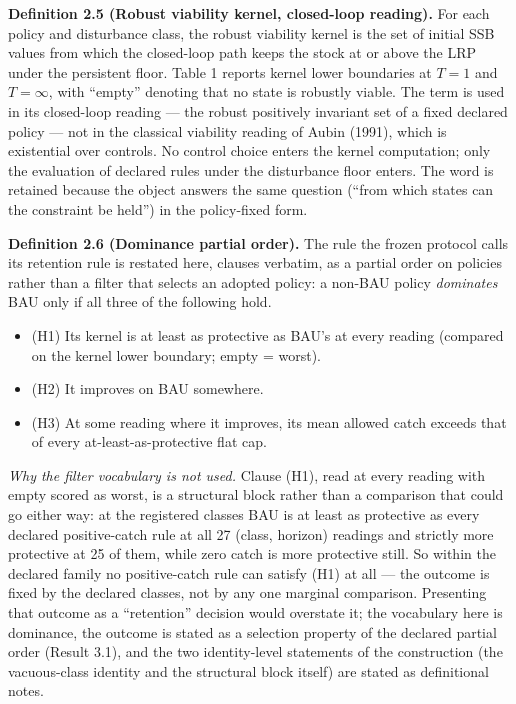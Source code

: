 \documentclass[11pt]{article}
\providecommand{\tightlist}{\setlength{\itemsep}{0pt}\setlength{\parskip}{0pt}}
\begin{document}
\textbf{Definition 2.5 (Robust viability kernel, closed-loop reading).}
For each policy and disturbance class, the robust viability kernel is
the set of initial SSB values from which the closed-loop path keeps the
stock at or above the LRP under the persistent floor. Table 1 reports
kernel lower boundaries at \(T=1\) and \(T=\infty\), with ``empty''
denoting that no state is robustly viable. The term is used in its
closed-loop reading --- the robust positively invariant set of a fixed
declared policy --- not in the classical viability reading of Aubin
(1991), which is existential over controls. No control choice enters the
kernel computation; only the evaluation of declared rules under the
disturbance floor enters. The word is retained because the object
answers the same question (``from which states can the constraint be
held'') in the policy-fixed form.

\textbf{Definition 2.6 (Dominance partial order).} The rule the frozen
protocol calls its retention rule is restated here, clauses verbatim, as
a partial order on policies rather than a filter that selects an adopted
policy: a non-BAU policy \emph{dominates} BAU only if all three of the
following hold.

\begin{itemize}
\tightlist
\item
  (H1) Its kernel is at least as protective as BAU's at every reading
  (compared on the kernel lower boundary; empty = worst).
\item
  (H2) It improves on BAU somewhere.
\item
  (H3) At some reading where it improves, its mean allowed catch exceeds
  that of every at-least-as-protective flat cap.
\end{itemize}

\emph{Why the filter vocabulary is not used.} Clause (H1), read at every
reading with empty scored as worst, is a structural block rather than a
comparison that could go either way: at the registered classes BAU is
at least as protective as every declared positive-catch rule at all 27
(class, horizon) readings and strictly more protective at 25 of them,
while zero catch is more protective still. So within the declared
family no positive-catch rule can satisfy (H1) at all --- the outcome
is fixed by the declared classes, not by any one marginal comparison.
Presenting that outcome as a ``retention'' decision would overstate it;
the vocabulary here is dominance, the outcome is stated as a selection
property of the declared partial order (Result 3.1), and the two
identity-level statements of the construction (the vacuous-class
identity and the structural block itself) are stated as definitional
notes.
\end{document}
